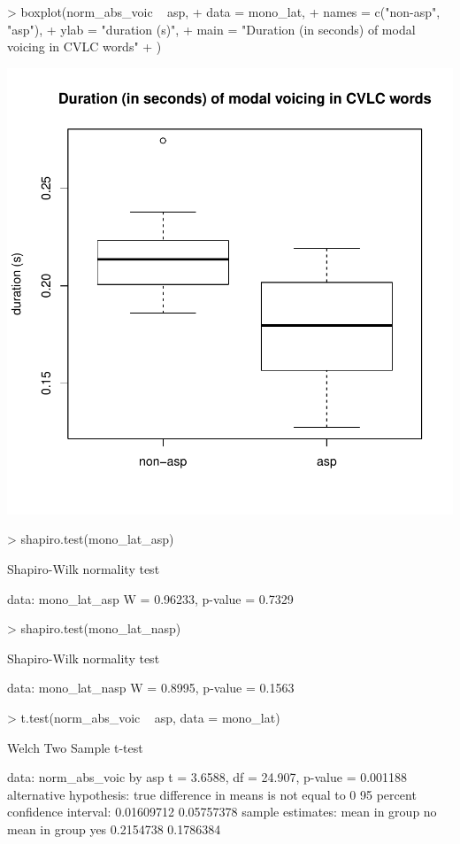 \documentclass[a4paper,11pt]{article}
\begin{document}
\begin{Schunk}
\begin{Sinput}
> boxplot(norm_abs_voic ~ asp,
+         data = mono_lat,
+         names = c("non-asp", "asp"),
+         ylab = "duration (s)",
+         main = "Duration (in seconds) of modal voicing in CVLC words"
+         )
\end{Sinput}
\end{Schunk}
\includegraphics{analysis-016}

\begin{Schunk}
\begin{Sinput}
> shapiro.test(mono_lat_asp)
\end{Sinput}
\begin{Soutput}
	Shapiro-Wilk normality test

data:  mono_lat_asp
W = 0.96233, p-value = 0.7329
\end{Soutput}
\begin{Sinput}
> shapiro.test(mono_lat_nasp)
\end{Sinput}
\begin{Soutput}
	Shapiro-Wilk normality test

data:  mono_lat_nasp
W = 0.8995, p-value = 0.1563
\end{Soutput}
\begin{Sinput}
> t.test(norm_abs_voic ~ asp, data = mono_lat)
\end{Sinput}
\begin{Soutput}
	Welch Two Sample t-test

data:  norm_abs_voic by asp
t = 3.6588, df = 24.907, p-value = 0.001188
alternative hypothesis: true difference in means is not equal to 0
95 percent confidence interval:
 0.01609712 0.05757378
sample estimates:
 mean in group no mean in group yes 
        0.2154738         0.1786384 
\end{Soutput}
\end{Schunk}
\end{document}
